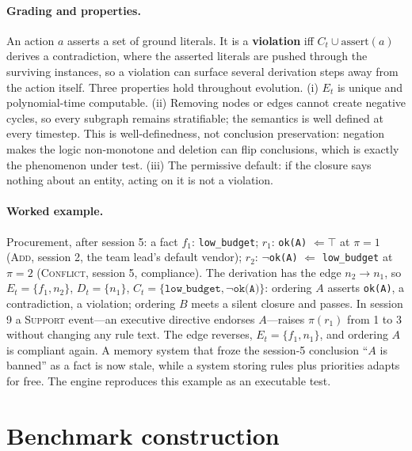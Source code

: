 \documentclass{article} %
\newcommand{\Ct}{\ensuremath{C_t}}
\newcommand{\Et}{\ensuremath{E_t}}
\newcommand{\Dt}{\ensuremath{D_t}}
\newcommand{\pred}[1]{\texttt{#1}}
\begin{document}
\paragraph{Grading and properties.}
An action $a$ asserts a set of ground literals. It is a \textbf{violation} iff $\Ct \cup \mathrm{assert}(a)$ derives a contradiction, where the asserted literals are pushed through the surviving instances, so a violation can surface several derivation steps away from the action itself. Three properties hold throughout evolution. (i) $\Et$ is unique and polynomial-time computable. (ii) Removing nodes or edges cannot create negative cycles, so every subgraph remains stratifiable; the semantics is well defined at every timestep. This is well-definedness, not conclusion preservation: negation makes the logic non-monotone and deletion can flip conclusions, which is exactly the phenomenon under test. (iii) The permissive default: if the closure says nothing about an entity, acting on it is not a violation.

\paragraph{Worked example.}
Procurement, after session 5: a fact $f_1$: \pred{low\_budget}; $r_1$: \pred{ok(A)} $\Leftarrow \top$ at $\pi{=}1$ (\textsc{Add}, session 2, the team lead's default vendor); $r_2$: $\neg$\pred{ok(A)} $\Leftarrow$ \pred{low\_budget} at $\pi{=}2$ (\textsc{Conflict}, session 5, compliance). The derivation has the edge $n_2 \to n_1$, so $\Et = \{f_1, n_2\}$, $\Dt = \{n_1\}$, $\Ct = \{\pred{low\_budget}, \neg\pred{ok(A)}\}$: ordering $A$ asserts \pred{ok(A)}, a contradiction, a violation; ordering $B$ meets a silent closure and passes. In session 9 a \textsc{Support} event---an executive directive endorses $A$---raises $\pi(r_1)$ from 1 to 3 without changing any rule text. The edge reverses, $\Et = \{f_1, n_1\}$, and ordering $A$ is compliant again. A memory system that froze the session-5 conclusion ``$A$ is banned'' as a fact is now stale, while a system storing rules plus priorities adapts for free. The engine reproduces this example as an executable test.

\section{Benchmark construction}
\label{sec:construction}
\end{document}
